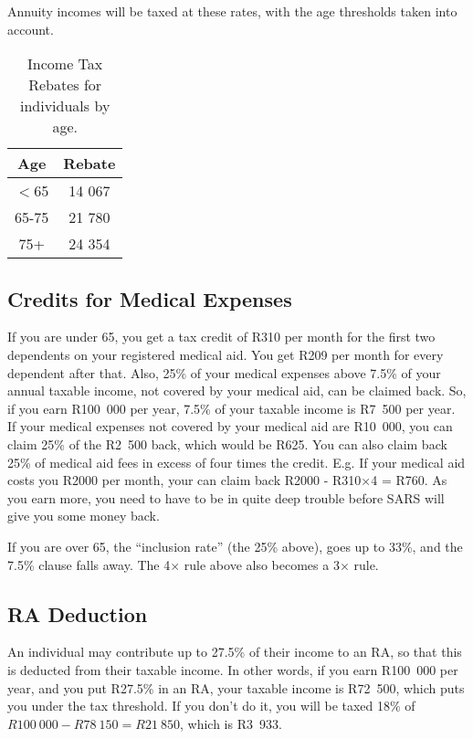 \documentclass[a4paper, justified]{tufte-handout}
\begin{document}
Annuity incomes will be taxed at these rates, with the age thresholds taken into account.

\begin{table}[]
	\centering
	\caption{Income Tax Rebates for individuals by age.}
	\label{tab:rebates}
	\begin{tabular}{cc}
		\toprule
		\textbf{Age}           & \textbf{Rebate} \\
		\midrule
		$<$65 & 14 067 \\
		65-75         & 21 780 \\
		75+           & 24 354\\
		\bottomrule
	\end{tabular}
\end{table}

\subsection{Credits for Medical Expenses}
If you are under 65, you get a tax credit of R310 per month for the first two dependents on your registered medical aid. You get R209 per month for every dependent after that. Also, 25\% of your medical expenses above 7.5\% of your annual taxable income, not covered by your medical aid, can be claimed back. So, if you earn R100~000 per year, 7.5\% of your taxable income is R7~500 per year. If your  medical expenses not covered by your medical aid are R10~000, you can claim 25\% of the R2~500 back, which would be R625. You can also claim back 25\% of medical aid fees in excess of four times the credit. E.g. If your medical aid costs you R2000 per month, your can claim back R2000 - R310$\times$4 = R760. As you earn more, you need to have to be in quite deep trouble before SARS will give you some money back.

If you are over 65, the ``inclusion rate'' (the 25\% above), goes up to 33\%, and the 7.5\% clause falls away. The 4$\times$ rule above also becomes a 3$\times$ rule.

\subsection{RA Deduction}
An individual may contribute up to 27.5\% of their income to an RA, so that this is deducted from their taxable income. In other words, if you earn R100~000 per year, and you put R27.5\% in an RA, your taxable income is R72~500, which puts you under the tax threshold. If you don't do it, you will be taxed 18\% of $R100~000-R78~150 = R21~850$, which is R3~933.
\end{document}
